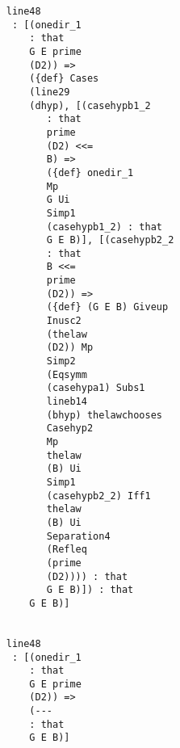 \documentclass[12pt]{article}
\begin{document}
\begin{verbatim}
                                    line48 
                                     : [(onedir_1 
                                        : that 
                                        G E prime 
                                        (D2)) => 
                                        ({def} Cases 
                                        (line29 
                                        (dhyp), [(casehypb1_2 
                                           : that 
                                           prime 
                                           (D2) <<= 
                                           B) => 
                                           ({def} onedir_1 
                                           Mp 
                                           G Ui 
                                           Simp1 
                                           (casehypb1_2) : that 
                                           G E B)], [(casehypb2_2 
                                           : that 
                                           B <<= 
                                           prime 
                                           (D2)) => 
                                           ({def} (G E B) Giveup 
                                           Inusc2 
                                           (thelaw 
                                           (D2)) Mp 
                                           Simp2 
                                           (Eqsymm 
                                           (casehypa1) Subs1 
                                           lineb14 
                                           (bhyp) thelawchooses 
                                           Casehyp2 
                                           Mp 
                                           thelaw 
                                           (B) Ui 
                                           Simp1 
                                           (casehypb2_2) Iff1 
                                           thelaw 
                                           (B) Ui 
                                           Separation4 
                                           (Refleq 
                                           (prime 
                                           (D2)))) : that 
                                           G E B)]) : that 
                                        G E B)]


                                    line48 
                                     : [(onedir_1 
                                        : that 
                                        G E prime 
                                        (D2)) => 
                                        (--- 
                                        : that 
                                        G E B)]



\end{verbatim}
\end{document}
